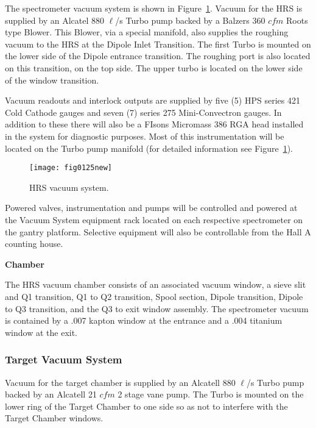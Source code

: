 The spectrometer vacuum system is shown in Figure~\ref{fig:hrs_vac_sys}.
Vacuum for the HRS is supplied by an Alcatel 880 $\ell$/s Turbo 
pump backed by a Balzers 360 $cfm$ Roots type Blower.  This Blower, via a 
special manifold, also supplies the roughing vacuum to the HRS at the 
Dipole Inlet Transition.  The first Turbo is mounted on the lower side 
of the Dipole entrance transition.  The roughing port is also located on 
this transition, on the top side.  The upper turbo is located on the 
lower side of the window transition.

Vacuum readouts and interlock outputs are supplied by five (5) HPS 
series 421 Cold Cathode gauges and seven (7) series 275 Mini-Convectron 
gauges.  In addition to these there will also be a FIsons Micromass 386 
RGA head installed in the system for diagnostic purposes.  Most of this 
instrumentation will be located on the Turbo pump manifold (for detailed 
information see Figure~\ref{fig:hrs_vac_sys}).

\begin{figure}
\begin{center}
\texttt{[image: fig0125new]}
{\linespread{1.}
\caption[Spectrometers: HRS Vacuum System]{HRS vacuum system.}
\label{fig:hrs_vac_sys}}
\end{center}
\end{figure}

Powered valves, instrumentation and pumps will be controlled and powered 
at the Vacuum System equipment rack located on each respective 
spectrometer on the gantry platform.  Selective equipment will also be 
controllable from the Hall A counting house.

{\bf Chamber}

The HRS vacuum chamber consists of an associated vacuum window, a sieve 
slit and Q1 transition, Q1 to Q2 transition, Spool section, Dipole 
transition, Dipole to Q3 transition, and the Q3 to exit window assembly. 
 The spectrometer vacuum is contained by a .007 kapton window at the
 entrance and a .004 titanium window at the exit.

\subsubsection{Target Vacuum System}

Vacuum for the target chamber is supplied by an Alcatell 880 $\ell$/s 
Turbo pump backed by an Alcatell 21 $cfm$ 2 stage vane pump.  The Turbo is 
mounted on the lower ring of the Target Chamber to one side so as not to 
interfere with the Target Chamber windows.

